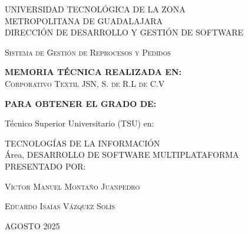 \documentclass[12pt,letterpaper,spanish]{report}
\begin{document}
\thispagestyle{empty}


\begin{center}

 \begin{minipage}[b]{.9\linewidth}
    \begin{center}
        \vspace{0.2in}
        \large{UNIVERSIDAD TECNOLÓGICA DE LA ZONA \\METROPOLITANA DE GUADALAJARA}\\
        \large{DIRECCIÓN DE DESARROLLO Y GESTIÓN DE SOFTWARE}\\
    \end{center}
\end{minipage}
\vspace{0.3in}


\centerline{\hbox{}}

\LARGE{\textsc{Sistema de Gestión de Reprocesos y Pedidos}}

\vspace{0.2in}
\large{\textbf{MEMORIA TÉCNICA REALIZADA EN:}}
 \\  \textsc{Corporativo Textil JSN, S. de R.L de C.V}

\vspace{0.2in}
\large{\textbf{PARA OBTENER EL GRADO DE:}}

\large{Técnico Superior Universitario (TSU) en:}


\large{TECNOLOGÍAS DE LA INFORMACIÓN\\Área, DESARROLLO DE SOFTWARE MULTIPLATAFORMA }
\\

\vspace{0.2in}
\large{PRESENTADO POR:}


\textsc{Víctor Manuel Montaño Juanpedro}  %


\textsc{Eduardo Isaías Vázquez Solís}  %

\vspace{0.2in}
\small{ AGOSTO 2025}
\end{center}


\newpage



\end{document}
